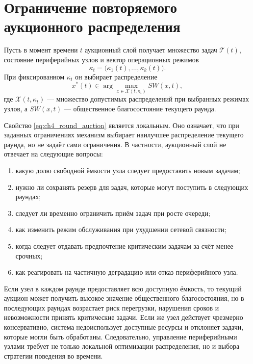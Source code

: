 \section{Ограничение повторяемого аукционного распределения}

Пусть в момент времени $t$ аукционный слой получает множество задач $\mathcal{T}(t)$, состояние периферийных узлов и вектор операционных режимов
\[
\kappa_t = \bigl(\kappa_1(t), \ldots, \kappa_k(t)\bigr).
\]
При фиксированном $\kappa_t$ он выбирает распределение
\begin{equation}
    x^*(t) \in \arg\max_{x \in \mathcal{X}(t,\kappa_t)} SW(x,t),
    \label{eq:ch4_round_auction}
\end{equation}
где $\mathcal{X}(t,\kappa_t)$ --- множество допустимых распределений при выбранных режимах узлов, а $SW(x,t)$ --- общественное благосостояние текущего раунда.

Свойство \eqref{eq:ch4_round_auction} является локальным. Оно означает, что при заданных ограничениях механизм выбирает наилучшее распределение текущего раунда, но не задаёт сами ограничения. В частности, аукционный слой не отвечает на следующие вопросы:
\begin{enumerate}
    \item какую долю свободной ёмкости узла следует предоставить новым задачам;
    \item нужно ли сохранять резерв для задач, которые могут поступить в следующих раундах;
    \item следует ли временно ограничить приём задач при росте очереди;
    \item как изменить режим обслуживания при ухудшении сетевой связности;
    \item когда следует отдавать предпочтение критическим задачам за счёт менее срочных;
    \item как реагировать на частичную деградацию или отказ периферийного узла.
\end{enumerate}

Если узел в каждом раунде предоставляет всю доступную ёмкость, то текущий аукцион может получить высокое значение общественного благосостояния, но в последующих раундах возрастает риск перегрузки, нарушения сроков и невозможности принять критические задачи. Если же узел действует чрезмерно консервативно, система недоиспользует доступные ресурсы и отклоняет задачи, которые могли быть обработаны. Следовательно, управление периферийными узлами требует не только локальной оптимизации распределения, но и выбора стратегии поведения во времени.

